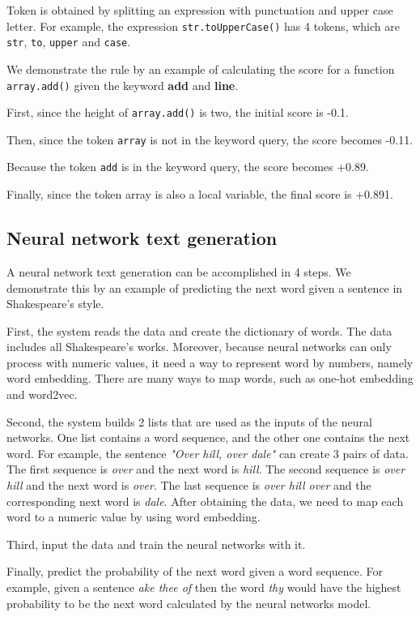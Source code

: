 \documentclass[PRO,english]{ipsj}
\begin{document}
Token is obtained by splitting an expression with punctuation and upper case letter. For example, the expression \texttt{str.toUpperCase()} has 4 tokens, which are \texttt{str}, \texttt{to}, \texttt{upper} and \texttt{case}.

We demonstrate the rule by an example of calculating the score for a function \texttt{array.add()} given the keyword \textbf{add} and \textbf{line}.

First, since the height of \texttt{array.add()} is two, the initial score is -0.1.

Then, since the token \texttt{array} is not in the keyword query, the score becomes -0.11.

Because the token \texttt{add} is in the keyword query, the score becomes +0.89.

Finally, since the token array is also a local variable, the final score is +0.891.

\subsection{Neural network text generation}
A neural network text generation can be accomplished in 4 steps. We demonstrate this by an example of predicting the next word given a sentence in Shakespeare's style. 

First, the system reads the data and create the dictionary of words. The data includes all Shakespeare's works. Moreover, because neural networks can only process with numeric values, it need a way to represent word by numbers, namely word embedding. There are many ways to map words, such as one-hot embedding and word2vec. 

Second, the system builds 2 lists that are used as the inputs of the neural networks. One list contains a word sequence, and the other one contains the next word. For example, the sentence \textit{"Over hill, over dale"} can create 3 pairs of data. The first sequence is \textit{over} and the next word is \textit{hill}. The second sequence is \textit{over hill} and the next word is \textit{over}. The last sequence is \textit{over hill over} and the corresponding next word is \textit{dale}. After obtaining the data, we need to map each word to a numeric value by using word embedding.

Third, input the data and train the neural networks with it. 

Finally, predict the probability of the next word given a word sequence. For example, given a sentence \textit{ake thee of} then the word \textit{thy} would have the highest probability to be the next word calculated by the neural networks model.
\end{document}
